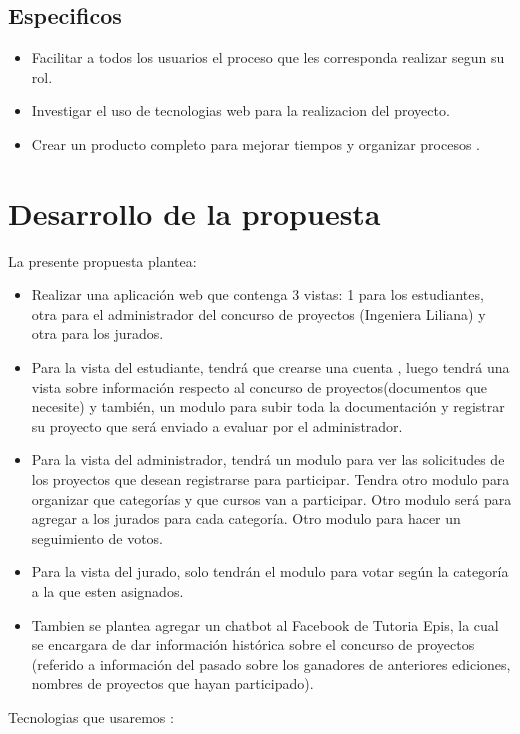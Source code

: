 \documentclass[%
 reprint,
 amsmath,amssymb,
 aps,
]{revtex4-1}
\begin{document}
\subsection {Especificos}
\begin{itemize}
\item Facilitar a todos los usuarios el proceso que les corresponda realizar segun su rol. \\
\item Investigar el uso de tecnologias web para la realizacion del proyecto.  \\
\item Crear un producto completo para mejorar tiempos y organizar procesos .\\
\end{itemize}

\section {Desarrollo de la propuesta}
La presente propuesta plantea:
\begin{itemize}
    \item Realizar una aplicación web que contenga 3 vistas: 1 para los estudiantes, otra para el administrador del concurso de proyectos (Ingeniera Liliana) y otra para los jurados.
     \item Para la vista del estudiante, tendrá que crearse una cuenta , luego tendrá una vista sobre información respecto al concurso de proyectos(documentos que necesite) y también, un modulo para subir toda la documentación y registrar su proyecto que será enviado a evaluar por el administrador.
     \item Para la vista del administrador, tendrá un modulo para ver las solicitudes de los proyectos que desean registrarse para participar. Tendra otro modulo para organizar que categorías y que cursos van a participar. Otro modulo será para agregar a los jurados para cada categoría. Otro modulo para hacer un seguimiento de votos. 
    \item Para la vista del jurado, solo tendrán el modulo para votar según la categoría a la que esten asignados.
    \item Tambien se plantea agregar un chatbot al Facebook de Tutoria Epis, la cual se encargara de dar información histórica sobre el concurso de proyectos (referido a información del pasado sobre los ganadores de anteriores ediciones, nombres de proyectos que hayan participado).
\end{itemize}
\newpage
Tecnologias que usaremos :
\end{document}
